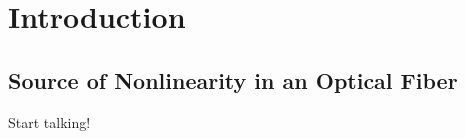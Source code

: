 
\renewcommand{\thechapter}{1}

\chapter{Introduction}

\section{Source of Nonlinearity in an Optical Fiber}

Start talking! ~\cite{lang1999}


